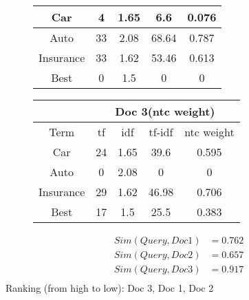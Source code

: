 \documentclass[11pt]{article}
\begin{document}
\begin{figure}[H]
\begin{minipage}{0.5\linewidth}
\begin{table}[H]
\begin{tabular}{|c|c|c|c|c|}
        Car      & 4  &1.65 & 6.6  & 0.076 \\ \hline
        Auto     & 33 &2.08 & 68.64& 0.787\\ \hline
        Insurance& 33 &1.62 & 53.46& 0.613\\ \hline
        Best     & 0  &1.5  & 0    & 0\\ \hline
      \end{tabular}
    \end{table}
  \end{minipage}
  \begin{minipage}{0.5\linewidth}
    \begin{table}[H]
      \centering
      \begin{tabular}{|c|c|c|c|c|} \hline
        & \multicolumn{4}{|c|}{Doc 3(ntc weight)}\\ \hline
        Term     & tf & idf & tf-idf & ntc weight \\ \hline
        Car      & 24 &1.65 & 39.6 & 0.595 \\ \hline
        Auto     & 0  &2.08 & 0    & 0\\ \hline
        Insurance& 29 &1.62 & 46.98& 0.706\\ \hline
        Best     & 17 &1.5  & 25.5 & 0.383\\ \hline
      \end{tabular}
    \end{table}
  \end{minipage}
\end{figure}
\begin{align*}
  Sim(Query, Doc 1) &= 0.762 \\
  Sim(Query, Doc 2) &= 0.657 \\
  Sim(Query, Doc 3) &= 0.917 \\
\end{align*}
Ranking (from high to low): Doc 3, Doc 1, Doc 2
\end{document}
